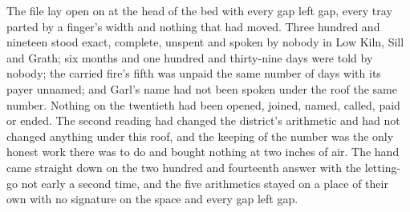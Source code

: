 The file lay open on  at the head of the bed with every gap left gap, every tray parted by a finger's width and nothing that had moved. Three hundred and nineteen stood exact, complete, unspent and spoken by nobody in Low Kiln, Sill and Grath; six months and one hundred and thirty-nine days were told by nobody; the carried fire's fifth was unpaid the same number of days with its payer unnamed; and Garl's name had not been spoken under the roof the same number. Nothing on the twentieth had been opened, joined, named, called, paid or ended. The second reading had changed the district's arithmetic and had not changed anything under this roof, and the keeping of the number was the only honest work there was to do and bought nothing at two inches of air. The hand came straight down on the two hundred and fourteenth answer with the letting-go not early a second time, and the five arithmetics stayed on a place of their own with no signature on the space and every gap left gap.
